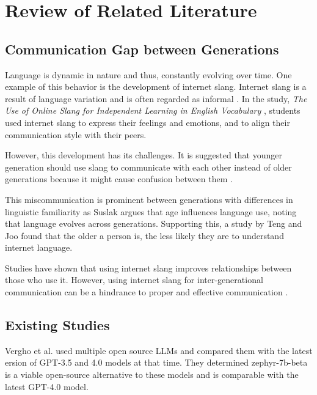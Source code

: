 \chapter{Review of Related Literature}
\label{sec:relatedlit}

\section{Communication Gap between Generations}
Language is dynamic in nature and thus, constantly evolving over time. One example of this behavior is the development of internet slang. Internet slang is a result of language variation and is often regarded as informal \cite{Liu_Gui_Zuo_Dai_2019}. In the study, \textit{The Use of Online Slang for Independent Learning in English Vocabulary} \cite{Ambarsari_Amrullah_Nawawi_2020}, students used internet slang to express their feelings and emotions, and to align their communication style with their peers. 

However, this development has its challenges. It is suggested that younger generation should use slang to communicate with each other instead of older generations because it might cause confusion between them \cite{Jeresano_Carretero_2022}.

This miscommunication is prominent between generations with differences in linguistic familiarity as Suslak \cite{SUSLAK2009199} argues that age influences language use, noting that language evolves across generations.
Supporting this, a study by Teng and Joo \cite{Teng_Joo2023} found that the older a person is, the less likely they are to understand internet language.

Studies have shown that using internet slang improves relationships between those who use it. However, using internet slang for inter-generational communication can be a hindrance to proper and effective communication \cite{gonzagaforda}.


\section{Existing Studies}
Vergho et al.\cite{vergho2024comparinggpt4opensourcelanguage} used multiple open source LLMs and compared them with the latest ersion of GPT-3.5 and 4.0 models at that time.
They determined zephyr-7b-beta is a viable open-source alternative to these models and is comparable with the latest GPT-4.0 model.

